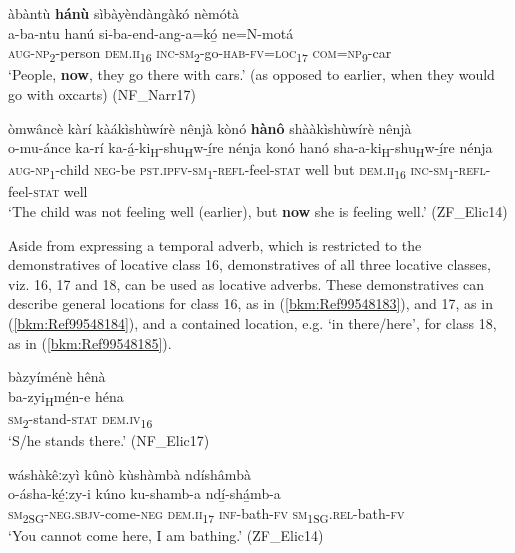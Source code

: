 \ea
\label{bkm:Ref491101554}
àbàntù \textbf{hánù} sìbàyèndàngàkó nèmótà\\
\gll a-ba-ntu    hanú    si-ba-end-ang-a=kó̲      ne=N-motá\\
\textsc{aug}-\textsc{np}\textsubscript{2}-person  \textsc{dem}.\textsc{ii}\textsubscript{16}  \textsc{inc}-\textsc{sm}\textsubscript{2}-go-\textsc{hab}-\textsc{fv}=\textsc{loc}\textsubscript{17}  \textsc{com}=\textsc{np}\textsubscript{9}-car\\
\glt ‘People, \textbf{now}, they go there with cars.’ (as opposed to earlier, when they would go with oxcarts) (NF\_Narr17)
\z

\newpage
\ea
\label{bkm:Ref491101556}
òmwâncè kàrí kàákìshùwírè nênjà kònó \textbf{hànô} shààkìshùwírè nênjà\\
\gll o-mu-ánce    ka-rí    ka-á̲-ki\textsubscript{H}-shu\textsubscript{H}w-í̲re      nénja konó  hanó    sha-a-ki\textsubscript{H}-shu\textsubscript{H}w-í̲re  nénja\\
\textsc{aug}-\textsc{np}\textsubscript{1}-child  \textsc{neg}-be  \textsc{pst}.\textsc{ipfv}-\textsc{sm}\textsubscript{1}-\textsc{refl}-feel-\textsc{stat}  well but  \textsc{dem}.\textsc{ii}\textsubscript{16} \textsc{inc}-\textsc{sm}\textsubscript{1}-\textsc{refl}-feel-\textsc{stat}  well\\
\glt ‘The child was not feeling well (earlier), but \textbf{now} she is feeling well.’ (ZF\_Elic14)
\z

Aside from expressing a temporal adverb, which is restricted to the demonstratives of locative class 16, demonstratives of all three locative classes, viz. 16, 17 and 18, can be used as locative adverbs. These demonstratives can describe general locations for class 16, as in (\ref{bkm:Ref99548183}), and 17, as in (\ref{bkm:Ref99548184}), and a contained location, e.g. ‘in there/here’, for class 18, as in (\ref{bkm:Ref99548185}).

\ea
\label{bkm:Ref99548183}
bàzyíménè hênà\\
\gll ba-zyi\textsubscript{H}mé̲n-e    héna\\
\textsc{sm}\textsubscript{2}-stand-\textsc{stat}  \textsc{dem}.\textsc{iv}\textsubscript{16}\\
\glt ‘S/he stands there.’ (NF\_Elic17)
\z

\ea
\label{bkm:Ref99548184}
wáshàkêːzyì kûnò kùshàmbà ndíshâmbà\\
\gll o-ásha-ké̲ːzy-i      kúno    ku-shamb-a  ndí̲-shá̲mb-a\\
\textsc{sm}\textsubscript{2SG}-\textsc{neg}.\textsc{sbjv}-come-\textsc{neg}  \textsc{dem}.\textsc{ii}\textsubscript{17}  \textsc{inf}-bath-\textsc{fv}  \textsc{sm}\textsubscript{1SG}.\textsc{rel}-bath-\textsc{fv}\\
\glt ‘You cannot come here, I am bathing.’ (ZF\_Elic14)
\z

